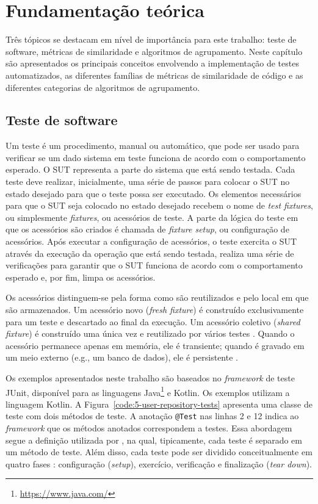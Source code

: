 \chapter{Fundamentação teórica}
\label{chapter:background}

Três tópicos se destacam em nível de importância para este trabalho: teste de software, métricas de similaridade e algoritmos de agrupamento. Neste capítulo são apresentados os principais conceitos envolvendo a implementação de testes automatizados, as diferentes famílias de métricas de similaridade de código e as diferentes categorias de algoritmos de agrupamento.

\section{Teste de software}

Um teste é um procedimento, manual ou automático, que pode ser usado para verificar se um dado sistema em teste funciona de acordo com o comportamento esperado. O SUT representa a parte do sistema que está sendo testada. Cada teste deve realizar, inicialmente, uma série de passos para colocar o SUT no estado desejado para que o teste possa ser executado. Os elementos necessários para que o SUT seja colocado no estado desejado recebem o nome de \textit{test fixtures}, ou simplesmente \textit{fixtures}, ou acessórios de teste. A parte da lógica do teste em que os acessórios são criados é chamada de \textit{fixture setup}, ou configuração de acessórios. Após executar a configuração de acessórios, o teste exercita o SUT através da execução da operação que está sendo testada, realiza uma série de verificações para garantir que o SUT funciona de acordo com o comportamento esperado e, por fim, limpa os acessórios.

Os acessórios distinguem-se pela forma como são reutilizados e pelo local em que são armazenados. Um acessório novo (\textit{fresh fixture}) é construído exclusivamente para um teste e descartado ao final da execução. Um acessório coletivo (\textit{shared fixture}) é construído uma única vez e reutilizado por vários testes \cite{meszaros:2007}. Quando o acessório permanece apenas em memória, ele é transiente; quando é gravado em um meio externo (e.g., um banco de dados), ele é persistente \cite{meszaros:2007}.

Os exemplos apresentados neste trabalho são baseados no \textit{framework} de teste JUnit, disponível para as linguagens Java\footnote{\url{https://www.java.com/}} e Kotlin. Os exemplos utilizam a linguagem Kotlin. A Figura~\ref{code:5-user-repository-tests} apresenta uma classe de teste com dois métodos de teste. A anotação \texttt{@Test} nas linhas 2 e 12 indica ao \textit{framework} que os métodos anotados correspondem a testes. Essa abordagem segue a definição utilizada por , na qual, tipicamente, cada teste é separado em um método de teste. Além disso, cada teste pode ser dividido conceitualmente em quatro fases \cite{meszaros:2007}: configuração (\textit{setup}), exercício, verificação e finalização (\textit{tear down}).

